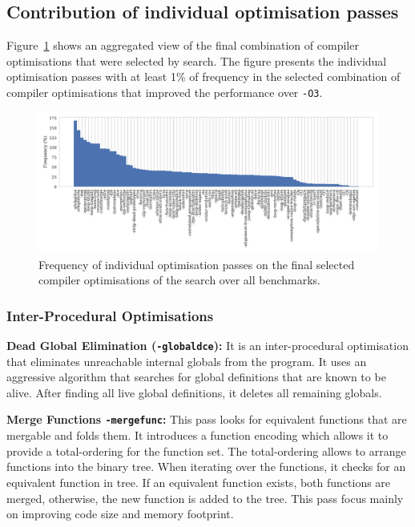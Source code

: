 \subsection{Contribution of individual optimisation passes}

Figure~\ref{fig:flagsfreq} shows an aggregated view of the final combination of compiler optimisations that were selected by {\itercomp} search.
The figure presents the individual optimisation passes with at least 1\% of frequency in the selected combination of compiler optimisations that improved the performance over {\texttt{-O3}}.

\begin{figure}[htb]
    \centering
    \includegraphics[width=\textwidth]{figs/flagsfreq.pdf}
    \caption{Frequency of individual optimisation passes on the final selected 
             compiler optimisations of the {\itercomp} search over
             all benchmarks.}
    \label{fig:flagsfreq}
\end{figure}

\subsubsection{Inter-Procedural Optimisations}
\noindent\textbf{Dead Global Elimination (\texttt{-globaldce}):}
It is an inter-procedural optimisation that eliminates unreachable internal globals from the program.
It uses an aggressive algorithm that searches for global definitions that are known to be alive.
After finding all live global definitions, it deletes all remaining globals.

\noindent\textbf{Merge Functions \texttt{-mergefunc}:}
This pass looks for equivalent functions that are mergable and folds them.
It introduces a function encoding which allows it to provide a total-ordering for the function set.
The total-ordering allows to arrange functions into the binary tree.
When iterating over the functions, it checks for an equivalent function in tree.
If an equivalent function exists, both functions are merged, otherwise, the new function is added to the tree.
This pass focus mainly on improving code size and memory footprint.

